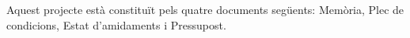 Aquest projecte està constituït pels quatre documents següents: Memòria, Plec de condicions, Estat d'amidaments i Pressupost.
